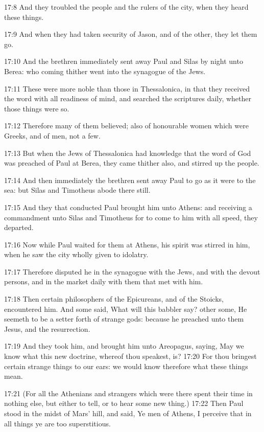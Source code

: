 17:8 And they troubled the people and the rulers of the city, when they heard these things.

17:9 And when they had taken security of Jason, and of the other, they let them go.

17:10 And the brethren immediately sent away Paul and Silas by night unto Berea: who coming thither went into the synagogue of the Jews.

17:11 These were more noble than those in Thessalonica, in that they received the word with all readiness of mind, and searched the scriptures daily, whether those things were so.

17:12 Therefore many of them believed; also of honourable women which were Greeks, and of men, not a few.

17:13 But when the Jews of Thessalonica had knowledge that the word of God was preached of Paul at Berea, they came thither also, and stirred up the people.

17:14 And then immediately the brethren sent away Paul to go as it were to the sea: but Silas and Timotheus abode there still.

17:15 And they that conducted Paul brought him unto Athens: and receiving a commandment unto Silas and Timotheus for to come to him with all speed, they departed.

17:16 Now while Paul waited for them at Athens, his spirit was stirred in him, when he saw the city wholly given to idolatry.

17:17 Therefore disputed he in the synagogue with the Jews, and with the devout persons, and in the market daily with them that met with him.

17:18 Then certain philosophers of the Epicureans, and of the Stoicks, encountered him. And some said, What will this babbler say? other some, He seemeth to be a setter forth of strange gods: because he preached unto them Jesus, and the resurrection.

17:19 And they took him, and brought him unto Areopagus, saying, May we know what this new doctrine, whereof thou speakest, is?  17:20 For thou bringest certain strange things to our ears: we would know therefore what these things mean.

17:21 (For all the Athenians and strangers which were there spent their time in nothing else, but either to tell, or to hear some new thing.)  17:22 Then Paul stood in the midst of Mars' hill, and said, Ye men of Athens, I perceive that in all things ye are too superstitious.

